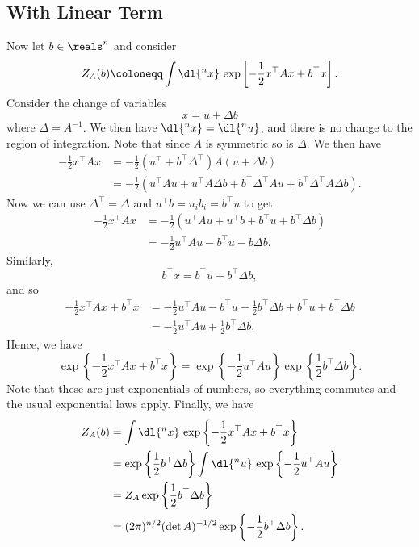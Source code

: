 \documentclass[fleqn]{NotesClass}
\newcommand{\trans}{{\top}}
\begin{document}
    \subsection{With Linear Term}
    Now let \(b \in \reals^n\) and consider
    \begin{equation}
        Z_A(b) \coloneqq \int \dl{^nx} \, \exp\left[ -\frac{1}{2} x^\trans Ax + b^\trans x \right].
    \end{equation}
    Consider the change of variables
    \begin{equation}
        x = u + \Delta b
    \end{equation}
    where \(\Delta = A^{-1}\).
    We then have \(\dl{^nx} = \dl{^nu}\), and there is no change to the region of integration.
    Note that since \(A\) is symmetric so is \(\Delta\).
    We then have
    \begin{align}
        -\frac{1}{2}x^\trans A x &= -\frac{1}{2}(u^\trans + b^\trans \Delta^\trans) A (u + \Delta b)\\
        &= -\frac{1}{2}(u^\trans A u + u^\trans A\Delta b + b^\trans \Delta^\trans A u + b^\trans \Delta^\trans A \Delta b).
    \end{align}
    Now we can use \(\Delta^\trans = \Delta\) and \(u^\trans b = u_ib_i = b^\trans u\) to get
    \begin{align}
        -\frac{1}{2} x^\trans A x &= -\frac{1}{2}(u^\trans A u + u^\trans b + b^\trans u + b^\trans \Delta b)\\
        &= -\frac{1}{2}u^\trans A u - b^\trans u - b \Delta b.
    \end{align}
    Similarly,
    \begin{equation}
        b^\trans x = b^\trans u + b^\trans \Delta b,
    \end{equation}
    and so
    \begin{align}
        -\frac{1}{2}x^\trans A x + b^\trans x &= -\frac{1}{2}u^\trans A u - b^\trans u - \frac{1}{2} b^\trans \Delta b + b^\trans u + b^\trans \Delta b\\
        &=  -\frac{1}{2} u^\trans A u + \frac{1}{2} b^\trans \Delta b.
    \end{align}
    Hence, we have
    \begin{equation}
        \exp\left\{ -\frac{1}{2}x^\trans A x + b^\trans x \right\} = \exp\left\{-\frac{1}{2} u^\trans A u\right\} \exp\left\{ \frac{1}{2} b^\trans \Delta b \right\}.
    \end{equation}
    Note that these are just exponentials of numbers, so everything commutes and the usual exponential laws apply.
    Finally, we have
    \begin{align}
        Z_A(b) &= \int \dl{^nx} \, \exp\left\{ -\frac{1}{2}x^\trans A x + b^\trans x \right\}\\
        &= \exp\left\{ \frac{1}{2}b^\trans \Delta b \right\} \int \dl{^nu} \, \exp\left\{ -\frac{1}{2}u^\trans A u \right\}\\
        &= Z_A\exp\left\{ \frac{1}{2}b^\trans \Delta b \right\}\\
        &= (2\pi)^{n/2} (\det A)^{-1/2} \exp\left\{ -\frac{1}{2}b^\trans \Delta b \right\}.
    \end{align}
    
\end{document}

